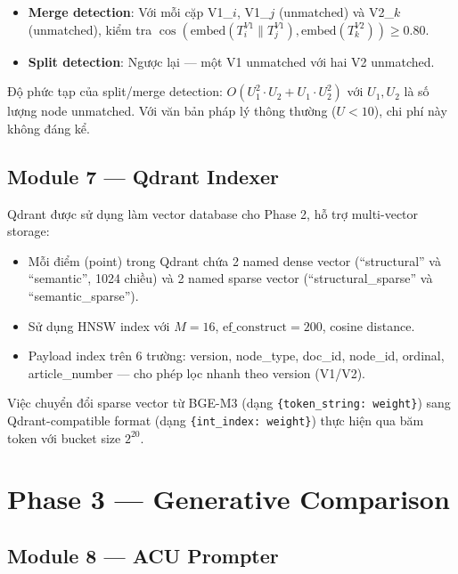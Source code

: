 \begin{itemize}
    \item \textbf{Merge detection}: Với mỗi cặp V1\_$i$, V1\_$j$ (unmatched) và V2\_$k$ (unmatched), kiểm tra $\cos(\text{embed}(T_i^{V1} \parallel T_j^{V1}), \text{embed}(T_k^{V2})) \geq 0.80$.
    \item \textbf{Split detection}: Ngược lại — một V1 unmatched với hai V2 unmatched.
\end{itemize}

Độ phức tạp của split/merge detection: $O(U_1^2 \cdot U_2 + U_1 \cdot U_2^2)$ với $U_1, U_2$ là số lượng node unmatched. Với văn bản pháp lý thông thường ($U < 10$), chi phí này không đáng kể.

\subsection{Module 7 — Qdrant Indexer}

Qdrant \cite{qdrant2024} được sử dụng làm vector database cho Phase 2, hỗ trợ multi-vector storage:

\begin{itemize}
    \item Mỗi điểm (point) trong Qdrant chứa 2 named dense vector (``structural'' và ``semantic'', 1024 chiều) và 2 named sparse vector (``structural\_sparse'' và ``semantic\_sparse'').
    \item Sử dụng HNSW index \cite{hnsw} với $M=16$, $\text{ef\_construct}=200$, cosine distance.
    \item Payload index trên 6 trường: version, node\_type, doc\_id, node\_id, ordinal, article\_number — cho phép lọc nhanh theo version (V1/V2).
\end{itemize}

Việc chuyển đổi sparse vector từ BGE-M3 (dạng \texttt{\{token\_string: weight\}}) sang Qdrant-compatible format (dạng \texttt{\{int\_index: weight\}}) thực hiện qua băm token với bucket size $2^{20}$.

\section{Phase 3 — Generative Comparison}

\subsection{Module 8 — ACU Prompter}

